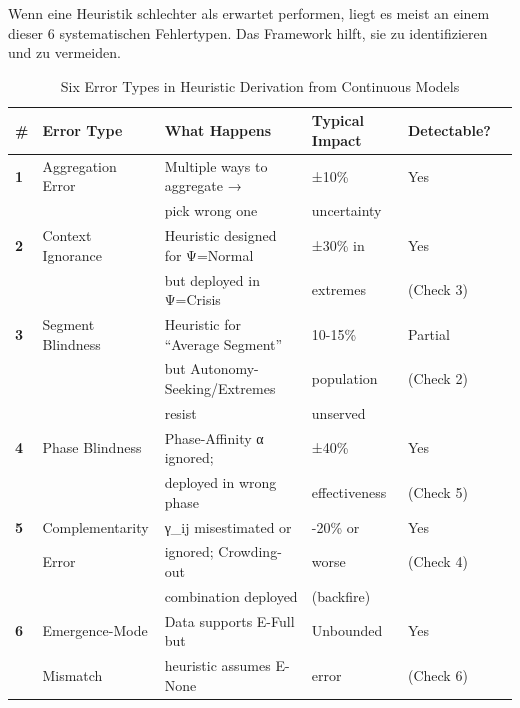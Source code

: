 \begin{tcolorbox}[colback=orange!5!white, colframe=orange!75!black, title=\textbf{Why Heuristics Fail: A Systematic Taxonomy}]

Wenn eine Heuristik schlechter als erwartet performen, liegt es meist an einem dieser 6 systematischen Fehlertypen. Das Framework hilft, sie zu identifizieren und zu vermeiden.

\end{tcolorbox}

\begin{table}[htbp]
\centering
\caption{Six Error Types in Heuristic Derivation from Continuous Models}
\label{tab:20-error-types}
\renewcommand{\arraystretch}{1.4}
\footnotesize
\begin{tabular}{@{}llp{5cm}lll@{}}
\toprule
\textbf{\#} & \textbf{Error Type} & \textbf{What Happens} & \textbf{Typical Impact} & \textbf{Detectable?} \\
\midrule
\textbf{1} & Aggregation Error & Multiple ways to aggregate → & ±10\% & Yes \\
 & & pick wrong one & uncertainty &  \\
\midrule
\textbf{2} & Context Ignorance & Heuristic designed for Ψ=Normal & ±30\% in & Yes \\
 & & but deployed in Ψ=Crisis & extremes & (Check 3) \\
\midrule
\textbf{3} & Segment Blindness & Heuristic for ``Average Segment'' & 10-15\% & Partial \\
 & & but Autonomy-Seeking/Extremes & population & (Check 2) \\
 & & resist & unserved & \\
\midrule
\textbf{4} & Phase Blindness & Phase-Affinity α ignored; & ±40\% & Yes \\
 & & deployed in wrong phase & effectiveness & (Check 5) \\
\midrule
\textbf{5} & Complementarity & γ_ij misestimated or & -20\% or & Yes \\
 & Error & ignored; Crowding-out & worse & (Check 4) \\
 & & combination deployed & (backfire) & \\
\midrule
\textbf{6} & Emergence-Mode & Data supports E-Full but & Unbounded & Yes \\
 & Mismatch & heuristic assumes E-None & error & (Check 6) \\
\bottomrule
\end{tabular}
\end{table}

